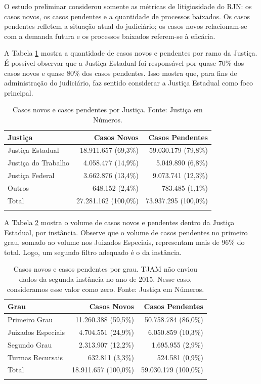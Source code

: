 \documentclass[]{report}
\begin{document}
O estudo preliminar considerou somente as métricas de litigiosidade do
RJN: os casos novos, os casos pendentes e a quantidade de processos
baixados. Os casos pendentes refletem a situação atual do judiciário; os
casos novos relacionam-se com a demanda futura e os processos baixados
referem-se à eficácia.

A Tabela \ref{tab:jntot} mostra a quantidade de casos novos e pendentes
por ramo da Justiça. É possível observar que a Justiça Estadual foi
responsável por quase 70\% dos casos novos e quase 80\% dos casos
pendentes. Isso mostra que, para fins de administração do judiciário,
faz sentido considerar a Justiça Estadual como foco principal.

\begin{longtable}{lrr}
\caption{Casos novos e casos pendentes por Justiça. Fonte: Justiça em Números.} \\
  \hline
Justiça & Casos Novos & Casos Pendentes \\
  \hline
Justiça Estadual & 18.911.657 (69,3\%) & 59.030.179 (79,8\%) \\
  Justiça do Trabalho & 4.058.477 (14,9\%) & 5.049.890 (6,8\%) \\
  Justiça Federal & 3.662.876 (13,4\%) & 9.073.741 (12,3\%) \\
  Outros & 648.152 (2,4\%) & 783.485 (1,1\%) \\
  \hline
  Total & 27.281.162 (100,0\%) & 73.937.295 (100,0\%) \\
\hline
\label{tab:jntot}
\end{longtable}

A Tabela \ref{tab:inst} mostra o volume de casos novos e pendentes
dentro da Justiça Estadual, por instância. Observe que o volume de casos
pendentes no primeiro grau, somado ao volume nos Juizados Especiais,
representam mais de 96\% do total. Logo, um segundo filtro adequado é o
da instância.

\begin{longtable}{lrr}
\caption{Casos novos e casos pendentes por grau. TJAM não enviou dados da segunda instância no ano de 2015. Nesse caso, consideramos esse valor como zero. Fonte: Justiça em Números.} \\
  \hline
Grau & Casos Novos & Casos Pendentes \\
  \hline
Primeiro Grau & 11.260.388 (59,5\%) & 50.758.784 (86,0\%) \\
  Juizados Especiais & 4.704.551 (24,9\%) & 6.050.859 (10,3\%) \\
  Segundo Grau & 2.313.907 (12,2\%) & 1.695.955 (2,9\%) \\
  Turmas Recursais & 632.811 (3,3\%) & 524.581 (0,9\%) \\
  \hline
  Total & 18.911.657 (100,0\%) & 59.030.179 (100,0\%) \\
\hline
\label{tab:inst}
\end{longtable}
\end{document}
